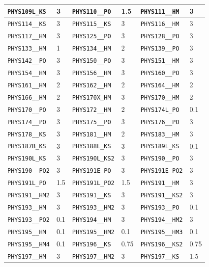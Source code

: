 \begin{longtable}{|l|l||l|l||l|l|}
    \verb|PHYS109L_KS| & 3 & \verb|PHYS110__PO| & 1.5 & \verb|PHYS111__HM| & 3\\\hline
    \verb|PHYS114__KS| & 3 & \verb|PHYS115__KS| & 3 & \verb|PHYS116__HM| & 3\\\hline
    \verb|PHYS117__HM| & 3 & \verb|PHYS125__PO| & 3 & \verb|PHYS128__PO| & 3\\\hline
    \verb|PHYS133__HM| & 1 & \verb|PHYS134__HM| & 2 & \verb|PHYS139__PO| & 3\\\hline
    \verb|PHYS142__PO| & 3 & \verb|PHYS150__PO| & 3 & \verb|PHYS151__HM| & 3\\\hline
    \verb|PHYS154__HM| & 3 & \verb|PHYS156__HM| & 3 & \verb|PHYS160__PO| & 3\\\hline
    \verb|PHYS161__HM| & 2 & \verb|PHYS162__HM| & 2 & \verb|PHYS164__HM| & 2\\\hline
    \verb|PHYS166__HM| & 2 & \verb|PHYS170X_HM| & 3 & \verb|PHYS170__HM| & 2\\\hline
    \verb|PHYS170__PO| & 3 & \verb|PHYS172__HM| & 2 & \verb|PHYS174L_PO| & 0.1\\\hline
    \verb|PHYS174__PO| & 3 & \verb|PHYS175__PO| & 3 & \verb|PHYS176__PO| & 3\\\hline
    \verb|PHYS178__KS| & 3 & \verb|PHYS181__HM| & 2 & \verb|PHYS183__HM| & 3\\\hline
    \verb|PHYS187B_KS| & 3 & \verb|PHYS188L_KS| & 3 & \verb|PHYS189L_KS| & 0.1\\\hline
    \verb|PHYS190L_KS| & 3 & \verb|PHYS190L_KS2| & 3 & \verb|PHYS190__PO| & 3\\\hline
    \verb|PHYS190__PO2| & 3 & \verb|PHYS191E_PO| & 3 & \verb|PHYS191E_PO2| & 3\\\hline
    \verb|PHYS191L_PO| & 1.5 & \verb|PHYS191L_PO2| & 1.5 & \verb|PHYS191__HM| & 3\\\hline
    \verb|PHYS191__HM2| & 3 & \verb|PHYS191__KS| & 3 & \verb|PHYS191__KS2| & 3\\\hline
    \verb|PHYS193__HM| & 3 & \verb|PHYS193__HM2| & 3 & \verb|PHYS193__PO| & 0.1\\\hline
    \verb|PHYS193__PO2| & 0.1 & \verb|PHYS194__HM| & 3 & \verb|PHYS194__HM2| & 3\\\hline
    \verb|PHYS195__HM| & 0.1 & \verb|PHYS195__HM2| & 0.1 & \verb|PHYS195__HM3| & 0.1\\\hline
    \verb|PHYS195__HM4| & 0.1 & \verb|PHYS196__KS| & 0.75 & \verb|PHYS196__KS2| & 0.75\\\hline
    \verb|PHYS197__HM| & 3 & \verb|PHYS197__HM2| & 3 & \verb|PHYS197__KS| & 1.5\\\hline

\end{longtable}
